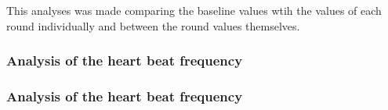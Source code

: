 This analyses was made comparing the baseline values wtih the values of each round individually and between the round values themselves.

\subsubsection{Analysis of the heart beat frequency}



%
%
\subsubsection{Analysis of the heart beat frequency}
%
